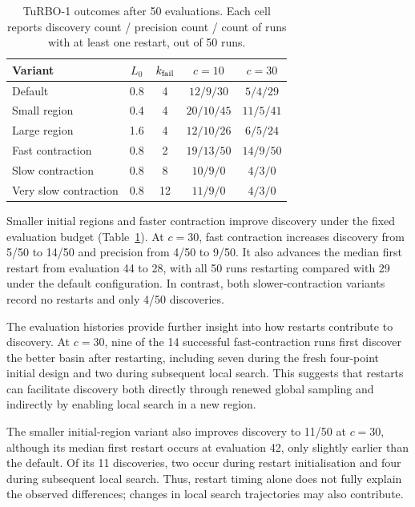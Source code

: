 \begin{table}[!htb]
 \centering
 \caption{TuRBO-1 outcomes after 50 evaluations. Each cell reports discovery count / precision count / count of runs with at least one restart, out of 50 runs.}
 \label{tab:turbo}
 \begin{tabular}{lcccc}
 \toprule
 Variant & \(L_0\) & \(k_{\rm fail}\) & \(c=10\) & \(c=30\)\\
 \midrule
 Default               & 0.8 & 4  & \(12/9/30\)  & \(5/4/29\)\\
 Small region          & 0.4 & 4  & \(20/10/45\) & \(11/5/41\)\\
 Large region          & 1.6 & 4  & \(12/10/26\) & \(6/5/24\)\\
 Fast contraction      & 0.8 & 2  & \(19/13/50\) & \(14/9/50\)\\
 Slow contraction      & 0.8 & 8  & \(10/9/0\)   & \(4/3/0\)\\
 Very slow contraction & 0.8 & 12 & \(11/9/0\)   & \(4/3/0\)\\
 \bottomrule
 \end{tabular}
\end{table}

Smaller initial regions and faster contraction improve discovery under the fixed evaluation budget (Table~\ref{tab:turbo}). At \(c=30\), fast contraction increases discovery from 5/50 to 14/50 and precision from 4/50 to 9/50. It also advances the median first restart from evaluation 44 to 28, with all 50 runs restarting compared with 29 under the default configuration. In contrast, both slower-contraction variants record no restarts and only 4/50 discoveries.

The evaluation histories provide further insight into how restarts contribute to discovery. At \(c=30\), nine of the 14 successful fast-contraction runs first discover the better basin after restarting, including seven during the fresh four-point initial design and two during subsequent local search. This suggests that restarts can facilitate discovery both directly through renewed global sampling and indirectly by enabling local search in a new region.

The smaller initial-region variant also improves discovery to 11/50 at \(c=30\), although its median first restart occurs at evaluation 42, only slightly earlier than the default. Of its 11 discoveries, two occur during restart initialisation and four during subsequent local search. Thus, restart timing alone does not fully explain the observed differences; changes in local search trajectories may also contribute.

